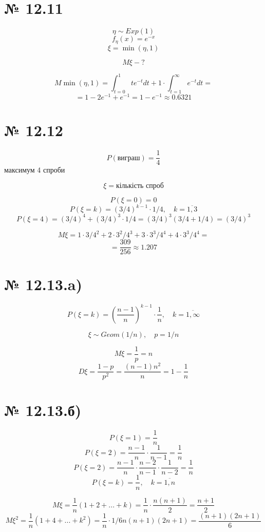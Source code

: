 \documentclass[11pt, a4paper]{article} %
\begin{document}
\section*{№ 12.11}
\begin{mdframed}
    $$\eta \sim Exp(1)$$
    $$f_\eta(x) = e^{-x}$$
    $$\xi = \min(\eta, 1)$$

    $$M\xi - ?$$
\end{mdframed}
$$M\min(\eta,1) = \int_{t=0}^1 t e^{-t} dt + 1 \cdot \int_{t=1}^\infty e^{-t}dt = $$
$$= 1 - 2e^{-1} + e^{-1} = 1-e^{-1} \approx 0.6321$$

\section*{№ 12.12}
\begin{mdframed}
    $$P(\text{виграш}) = \frac{1}{4}$$
    максимум 4 спроби

    $$\xi = \text{кількість спроб}$$
\end{mdframed}

$$P(\xi = 0) = 0$$
$$P(\xi = k) = (3/4)^{k-1}\cdot 1/4, \quad k=\overline{1,3}$$
$$P(\xi = 4) = (3/4)^{4} + (3/4)^3\cdot 1/4 = (3/4)^3(3/4 + 1/4) = (3/4)^3$$

$$M\xi = 1\cdot 3/4^2 + 2 \cdot 3^2/4^3 + 3 \cdot 3^3/4^4 + 4 \cdot 3^3/4^4 =$$
$$ = \frac{309}{256} \approx 1.207$$

\section*{№ 12.13.a)}
$$P(\xi = k) = \left(\frac{n-1}{n}\right)^{k-1} \cdot \frac{1}{n}, \quad k=\overline{1,\infty}$$

$$\xi \sim Geom(1/n), \quad p = 1/n$$

$$M\xi = \frac{1}{p} = n$$
$$D\xi = \frac{1-p}{p^2} = \frac{(n-1)n^2}{n} = 1-\frac{1}{n}$$


\section*{№ 12.13.б)}
$$P(\xi = 1) = \frac{1}{n}$$
$$P(\xi = 2) = \frac{n-1}{n}\cdot \frac{1}{n-1} = \frac{1}{n}$$
$$P(\xi = 2) = \frac{n-1}{n}\cdot \frac{n-2}{n-1}\cdot\frac{1}{n-2} = \frac{1}{n}$$
$$P(\xi = k) = \frac{1}{n}, \quad k=\overline{1,n}$$

$$M\xi = \frac{1}{n} (1+2+...+k) = \frac{1}{n} \cdot \frac{n(n+1)}{2} = \frac{n+1}{2}$$
$$M\xi^2 = \frac{1}{n} (1+4+...+k^2) = \frac{1}{n} \cdot 1/6 n (n + 1) (2 n + 1) = \frac{(n+1)(2n+1)}{6}$$
\end{document}
